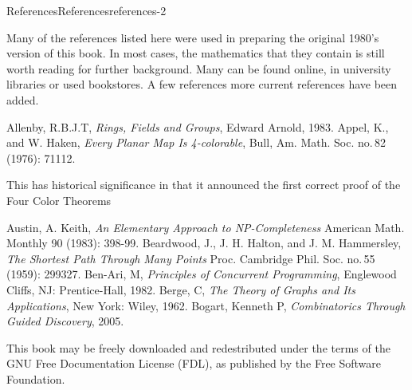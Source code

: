 \documentclass[twoside,10pt,]{book}
\numberwithin{equation}{section}
\begin{document}
\begin{references-chapter-numberless}{References}{}{References}{}{}{references-2}
\begin{introduction}{}%
\hypertarget{p-6219}{}%
Many of the references listed here were used in preparing the original 1980's version of this book.  In most cases, the mathematics that they contain is still worth reading for further background. Many can be found online, in university libraries or used bookstores.  A few references more current references have been added.%
\end{introduction}%
\begin{referencelist}
\hypertarget{biblio-allenby-1983}{}Allenby, R.B.J.T, \textit{Rings, Fields and Groups}, Edward Arnold, 1983.
\hypertarget{biblio-appel-1976}{}Appel, K., and W. Haken, \textit{Every Planar Map Is 4-colorable},  Bull, Am. Math. Soc. no.\@\,82 (1976): 711\textendash{}12.\par\hypertarget{note-37}{}
\hypertarget{p-6220}{}%
This has historical significance in that it announced the first correct proof of the Four Color Theorems%

\hypertarget{biblio-austin-1983}{}Austin, A. Keith, \textit{An Elementary Approach to NP-Completeness} American Math. Monthly 90 (1983): 398-99.
\hypertarget{biblio-beardwood-1959}{}Beardwood, J., J. H. Halton, and J. M. Hammersley, \textit{The Shortest Path Through Many Points} Proc. Cambridge Phil. Soc. no.\@\,55 (1959): 299\textendash{}327.
\hypertarget{biblio-benari-1982}{}Ben-Ari, M, \textit{Principles of Concurrent Programming}, Englewood Cliffs, NJ: Prentice-Hall, 1982.
\hypertarget{biblio-berge-1962}{}Berge, C, \textit{The Theory of Graphs and Its Applications}, New York: Wiley, 1962.
\hypertarget{biblio-bogart-2005}{}Bogart, Kenneth P, \textit{Combinatorics Through Guided Discovery},  2005.\par\hypertarget{note-38}{}
\hypertarget{p-6221}{}%
This book may be freely downloaded and redestributed   under the terms of the GNU Free Documentation License (FDL), as published by the Free Software Foundation.%


\end{referencelist}
\end{references-chapter-numberless}
\end{document}
